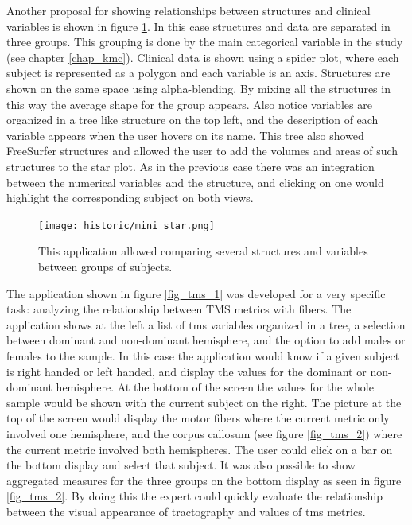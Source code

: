 Another proposal for showing relationships between structures and clinical variables is shown in figure \ref{fig_star_1}. In this case structures and data are separated in three groups. This grouping is done by the main categorical variable in the study (see chapter \ref{chap_kmc}). Clinical data is shown using a spider plot, where each subject is represented as a polygon and each variable is an axis. Structures are shown on the same space using alpha-blending. By mixing all the structures in this way the average shape for the group appears. Also notice variables are organized in a tree like structure on the top left, and the description of each variable appears when the user hovers on its name. This tree also showed FreeSurfer structures and allowed the user to add the volumes and areas of such structures to the star plot. As in the previous case there was an integration between the numerical variables and the structure, and clicking on one would highlight the corresponding subject on both views.

\begin{figure}
\centering
\texttt{[image: historic/mini\_star.png]} 
\caption{\label{fig_star_1}This application allowed comparing several structures and variables between groups of subjects.}
\end{figure}

The application shown in figure \ref{fig_tms_1} was developed for a very specific task: analyzing the relationship between TMS metrics with fibers. The application shows at the left a list of tms variables organized in a tree, a selection between dominant and non-dominant hemisphere, and the option to add males or females to the sample. In this case the application would know if a given subject is right handed or left handed, and display the values for the dominant or non-dominant hemisphere. At the bottom of the screen the values for the whole sample would be shown with the current subject on the right. The picture at the top of the screen would display the motor fibers where the current metric only involved one hemisphere, and the corpus callosum (see figure \ref{fig_tms_2}) where the current metric involved both hemispheres. The user could click on a bar on the bottom display and select that subject.
It was also possible to show aggregated measures for the three groups on the bottom display as seen in figure  \ref{fig_tms_2}. By doing this the expert could quickly evaluate the relationship between the visual appearance of tractography and values of tms metrics. 

